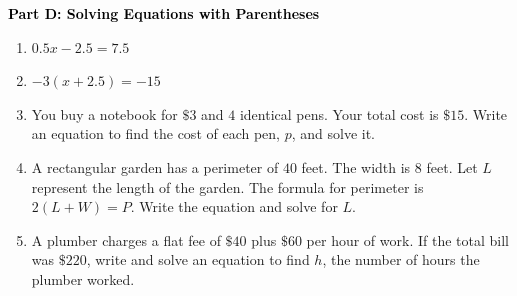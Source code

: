 \documentclass[12pt, letterpaper, fleqn]{article}
\begin{document}
\begin{tcolorbox}[colback=customteal!20]
\large\textcolor{black}{\textbf{Part D: Solving Equations with Parentheses}}
\end{tcolorbox}

\vspace{3mm}

\begin{enumerate}[itemsep=2.5cm, leftmargin=0.6cm, resume]
\item $0.5x - 2.5 = 7.5$
\item $-3(x + 2.5) = -15$
\item You buy a notebook for $\$3$ and $4$ identical pens. Your total cost is $\$15$. Write an equation to find the cost of each pen, $p$, and solve it.
\item A rectangular garden has a perimeter of $40$ feet. The width is $8$ feet. Let $L$ represent the length of the garden. The formula for perimeter is $2(L + W) = P$. Write the equation and solve for $L$.
\item A plumber charges a flat fee of $\$40$ plus $\$60$ per hour of work. If the total bill was $\$220$, write and solve an equation to find $h$, the number of hours the plumber worked.
\end{enumerate}
\end{document}
